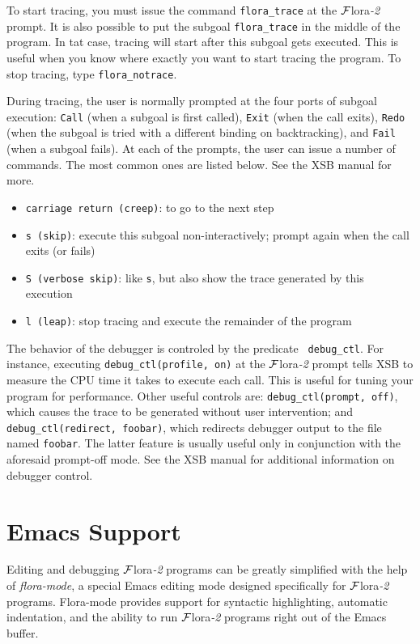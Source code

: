 \documentclass[11pt]{article}
\newcommand{\FLORA}{{\mbox{${\cal F}${\sc lora}\rm\emph{-2}}}\xspace}
\begin{document}
To start tracing, you must issue the command {\tt flora\_trace} at the
\FLORA prompt. It is also possible to put the subgoal {\tt flora\_trace} in
the middle of the program. In tat case, tracing will start after this
subgoal gets executed. This is useful when you know where exactly you want
to start tracing the program. To stop tracing, type {\tt flora\_notrace}.

During tracing, the user is normally prompted at the four ports of subgoal
execution: {\tt Call} (when a subgoal is first called), {\tt Exit} (when
the call exits), {\tt Redo} (when the subgoal is tried with a different
binding on backtracking), and {\tt Fail} (when a subgoal fails).
At each of the prompts, the user can issue a number of commands. The most
common ones are listed below. See the XSB manual for more.
\begin{itemize}
  \item {\tt carriage return (creep)}:  to go to the next step  
  \item {\tt s (skip)}: execute this subgoal non-interactively; prompt
    again when the call exits (or fails)
  \item {\tt S (verbose skip)}: like {\tt s}, but also show the trace
    generated by this execution
  \item {\tt l (leap)}: stop tracing and execute the remainder of the
    program
\end{itemize}
The behavior of the debugger is controled by the predicate {\tt
  debug\_ctl}. For instance, executing {\tt debug\_ctl(profile, on)} at the
\FLORA prompt tells XSB to measure the CPU time it takes to execute each
call. This is useful for tuning your program for performance. Other useful
controls are: {\tt debug\_ctl(prompt, off)}, which causes the trace to be
generated without user intervention; and {\tt debug\_ctl(redirect,
  foobar)}, which redirects debugger output to the file named {\tt foobar}.
The latter feature is usually useful only in conjunction with the
  aforesaid prompt-off mode. See the XSB manual for additional information
  on debugger control.


\section{Emacs Support}

Editing and debugging \FLORA programs can be greatly simplified with the
help of \emph{flora-mode}, a special Emacs editing mode designed
specifically for \FLORA programs. Flora-mode provides support for syntactic
highlighting, automatic indentation, and the ability to run \FLORA programs
right out of the Emacs buffer.
\end{document}
